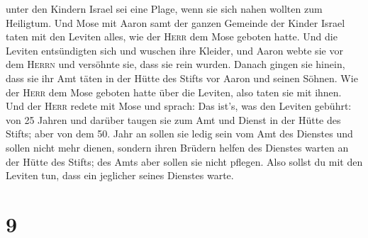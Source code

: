 unter den Kindern Israel sei eine Plage, wenn sie sich nahen wollten zum
Heiligtum.  Und Mose mit Aaron samt der ganzen Gemeinde
der Kinder Israel taten mit den Leviten alles, wie der \textsc{Herr} dem
Mose geboten hatte.  Und die Leviten entsündigten sich
und wuschen ihre Kleider, und Aaron webte sie vor dem \textsc{Herrn} und
versöhnte sie, dass sie rein wurden.  Danach gingen sie
hinein, dass sie ihr Amt täten in der Hütte des Stifts vor Aaron und
seinen Söhnen. Wie der \textsc{Herr} dem Mose geboten hatte über die
Leviten, also taten sie mit ihnen.  Und der \textsc{Herr}
redete mit Mose und sprach:  Das ist's, was den Leviten
gebührt: von 25 Jahren und darüber taugen sie zum Amt und Dienst in der
Hütte des Stifts;  aber von dem 50. Jahr an sollen sie
ledig sein vom Amt des Dienstes und sollen nicht mehr dienen,
 sondern ihren Brüdern helfen des Dienstes warten an der
Hütte des Stifts; des Amts aber sollen sie nicht pflegen. Also sollst du
mit den Leviten tun, dass ein jeglicher seines Dienstes warte.

\hypertarget{section-8}{%
\section{9}\label{section-8}}

